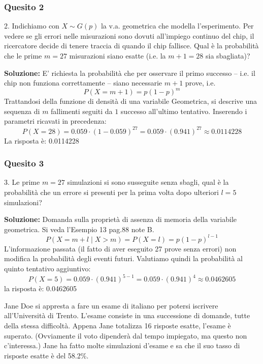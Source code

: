 \documentclass[12pt, a4paper]{article}
\begin{document}
\subsubsection*{Quesito 2}
2. Indichiamo con $X \sim G(p)$ la v.a. geometrica che modella l’esperimento.
Per vedere se gli errori nelle misurazioni sono dovuti all’impiego continuo del chip, il ricercatore decide di tenere traccia di quando il chip fallisce.
Qual è la probabilità che le prime $m=27$ misurazioni siano esatte (i.e. la $m+1=28$ sia sbagliata)?

\textbf{Soluzione:}
E’ richiesta la probabilità che per osservare il primo successo – i.e. il chip non funziona correttamente – siano necessarie $m+1$ prove, i.e. 
$$ P(X=m+1) = p(1-p)^m $$
Trattandosi della funzione di densità di una variabile Geometrica, si descrive una sequenza di $m$ fallimenti seguiti da $1$ successo all'ultimo tentativo. Inserendo i parametri ricavati in precedenza:
$$ P(X=28) = 0.059 \cdot (1 - 0.059)^{27} = 0.059 \cdot (0.941)^{27} \approx 0.0114228 $$
La risposta è: 0.0114228

\subsubsection*{Quesito 3}
3. Le prime $m=27$ simulazioni si sono susseguite senza sbagli, qual è la probabilità che un errore si presenti per la prima volta dopo ulteriori $l=5$ simulazioni?

\textbf{Soluzione:}
Domanda sulla proprietà di assenza di memoria della variabile geometrica. Si veda l’Esempio 13 pag.88 note B.
$$ P(X=m+l \mid X>m) = P(X=l) = p(1-p)^{l-1} $$
L'informazione passata (il fatto di aver eseguito 27 prove senza errori) non modifica la probabilità degli eventi futuri. Valutiamo quindi la probabilità al quinto tentativo aggiuntivo:
$$ P(X=5) = 0.059 \cdot (0.941)^{5-1} = 0.059 \cdot (0.941)^4 \approx 0.0462605 $$
la risposta è: 0.0462605


\vspace{0.5cm}
\begin{tcolorbox}[colback=lightergray!10, colframe=tocsec, title=\textbf{Esercizio 4}]
Jane Doe si appresta a fare un esame di italiano per potersi iscrivere all’Università di Trento. L’esame consiste in una successione di domande, tutte della stessa difficoltà. Appena Jane totalizza 16 risposte esatte, l’esame è superato. (Ovviamente il voto dipenderà dal tempo impiegato, ma questo non c’interessa.) Jane ha fatto molte simulazioni d’esame e sa che il suo tasso di risposte esatte è del 58.2\%.
\end{tcolorbox}
\end{document}

